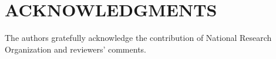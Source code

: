 \section{ACKNOWLEDGMENTS}

The authors gratefully acknowledge the contribution of National Research Organization and reviewers' comments.

